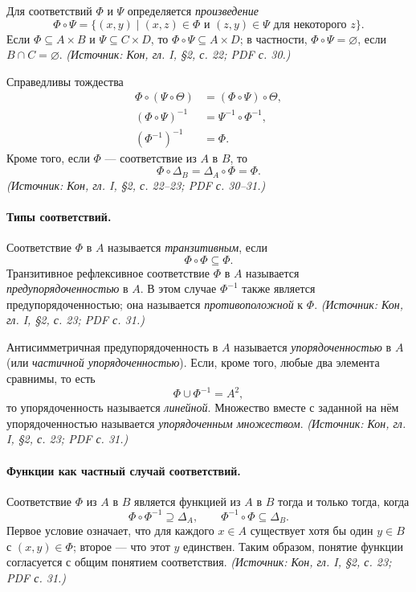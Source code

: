 \documentclass[a4paper,12pt]{article}
\begin{document}
Для соответствий \(\Phi\) и \(\Psi\) определяется \emph{произведение}
\[
\Phi\circ\Psi=\{(x,y)\mid (x,z)\in\Phi\text{ и }(z,y)\in\Psi\text{ для некоторого }z\}.
\]
Если \(\Phi\subseteq A\times B\) и \(\Psi\subseteq C\times D\), то \(\Phi\circ\Psi\subseteq A\times D\); в частности, \(\Phi\circ\Psi=\varnothing\), если \(B\cap C=\varnothing\).
\textit{(Источник: Кон, гл. I, §2, с. 22; PDF с. 30.)}

Справедливы тождества
\[
\begin{aligned}
\Phi\circ(\Psi\circ\Theta)&=(\Phi\circ\Psi)\circ\Theta,\\
(\Phi\circ\Psi)^{-1}&=\Psi^{-1}\circ\Phi^{-1},\\
(\Phi^{-1})^{-1}&=\Phi.
\end{aligned}
\]
Кроме того, если \(\Phi\) — соответствие из \(A\) в \(B\), то
\[
\Phi\circ\Delta_B=\Delta_A\circ\Phi=\Phi.
\]
\textit{(Источник: Кон, гл. I, §2, с. 22--23; PDF с. 30--31.)}

\paragraph{Типы соответствий.}
Соответствие \(\Phi\) в \(A\) называется \emph{транзитивным}, если
\[
\Phi\circ\Phi\subseteq\Phi.
\]
Транзитивное рефлексивное соответствие \(\Phi\) в \(A\) называется \emph{предупорядоченностью} в \(A\). В этом случае \(\Phi^{-1}\) также является предупорядоченностью; она называется \emph{противоположной} к \(\Phi\).
\textit{(Источник: Кон, гл. I, §2, с. 23; PDF с. 31.)}

Антисимметричная предупорядоченность в \(A\) называется \emph{упорядоченностью} в \(A\) (или \emph{частичной упорядоченностью}). Если, кроме того, любые два элемента сравнимы, то есть
\[
\Phi\cup\Phi^{-1}=A^2,
\]
то упорядоченность называется \emph{линейной}. Множество вместе с заданной на нём упорядоченностью называется \emph{упорядоченным множеством}.
\textit{(Источник: Кон, гл. I, §2, с. 23; PDF с. 31.)}

\paragraph{Функции как частный случай соответствий.}
Соответствие \(\Phi\) из \(A\) в \(B\) является функцией из \(A\) в \(B\) тогда и только тогда, когда
\[
\Phi\circ\Phi^{-1}\supseteq\Delta_A,
\qquad
\Phi^{-1}\circ\Phi\subseteq\Delta_B.
\]
Первое условие означает, что для каждого \(x\in A\) существует хотя бы один \(y\in B\) с \((x,y)\in\Phi\); второе — что этот \(y\) единствен. Таким образом, понятие функции согласуется с общим понятием соответствия.
\textit{(Источник: Кон, гл. I, §2, с. 23; PDF с. 31.)}
\end{document}
